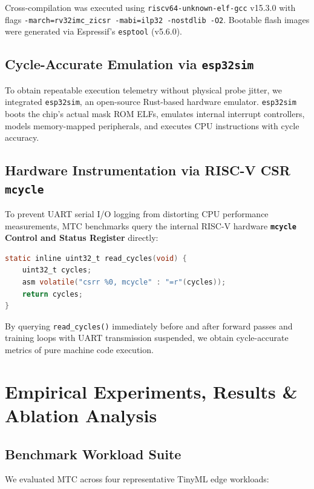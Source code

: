 \documentclass[12pt,a4paper]{report}
\begin{document}
Cross-compilation was executed using \texttt{riscv64-unknown-elf-gcc} v15.3.0 with flags \texttt{-march=rv32imc\_zicsr -mabi=ilp32 -nostdlib -O2}. Bootable flash images were generated via Espressif's \texttt{esptool} (v5.6.0).

\section{Cycle-Accurate Emulation via \texttt{esp32sim}}
To obtain repeatable execution telemetry without physical probe jitter, we integrated \texttt{esp32sim}, an open-source Rust-based hardware emulator. \texttt{esp32sim} boots the chip's actual mask ROM ELFs, emulates internal interrupt controllers, models memory-mapped peripherals, and executes CPU instructions with cycle accuracy.

\section{Hardware Instrumentation via RISC-V CSR \texttt{mcycle}}
To prevent UART serial I/O logging from distorting CPU performance measurements, MTC benchmarks query the internal RISC-V hardware \textbf{\texttt{mcycle} Control and Status Register} directly:
\begin{lstlisting}[language=C,caption={Direct RISC-V Hardware CSR \texttt{mcycle} Read}]
static inline uint32_t read_cycles(void) {
    uint32_t cycles;
    asm volatile("csrr %0, mcycle" : "=r"(cycles));
    return cycles;
}
\end{lstlisting}
By querying \texttt{read\_cycles()} immediately before and after forward passes and training loops with UART transmission suspended, we obtain cycle-accurate metrics of pure machine code execution.

\chapter{Empirical Experiments, Results \& Ablation Analysis}

\section{Benchmark Workload Suite}
We evaluated MTC across four representative TinyML edge workloads:
\end{document}
